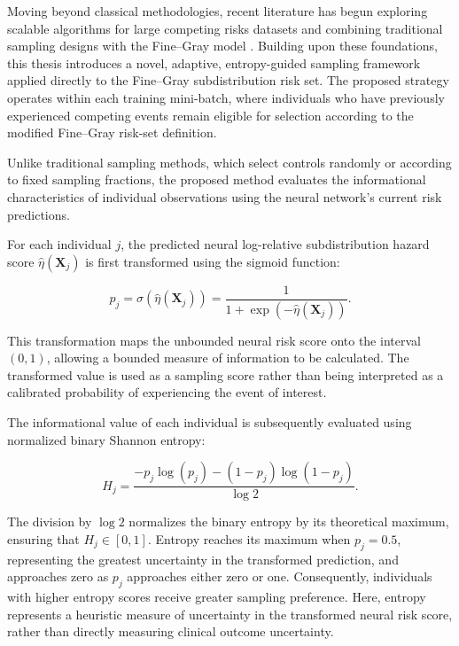 \documentclass[a4paper,twoside,12pt]{report}
\begin{document}
Moving beyond classical methodologies, recent literature has begun exploring scalable algorithms for large competing risks datasets \cite{kawaguchi2020scalable} and combining traditional sampling designs with the Fine--Gray model \cite{kim2020stratified}. Building upon these foundations, this thesis introduces a novel, adaptive, entropy-guided sampling framework applied directly to the Fine--Gray subdistribution risk set. The proposed strategy operates within each training mini-batch, where individuals who have previously experienced competing events remain eligible for selection according to the modified Fine--Gray risk-set definition.

Unlike traditional sampling methods, which select controls randomly or according to fixed sampling fractions, the proposed method evaluates the informational characteristics of individual observations using the neural network's current risk predictions.

For each individual $j$, the predicted neural log-relative subdistribution hazard score $\hat{\eta}(\boldsymbol{X}_j)$ is first transformed using the sigmoid function:

\begin{equation}
p_j =
\sigma\left(\hat{\eta}(\boldsymbol{X}_j)\right)
=
\frac{1}{1+\exp(-\hat{\eta}(\boldsymbol{X}_j))}.
\end{equation}

This transformation maps the unbounded neural risk score onto the interval $(0,1)$, allowing a bounded measure of information to be calculated. The transformed value is used as a sampling score rather than being interpreted as a calibrated probability of experiencing the event of interest.

The informational value of each individual is subsequently evaluated using normalized binary Shannon entropy:

\begin{equation}
H_j =
\frac{
-p_j\log(p_j)
-(1-p_j)\log(1-p_j)
}{\log 2}.
\end{equation}

The division by $\log 2$ normalizes the binary entropy by its theoretical maximum, ensuring that $H_j \in [0,1]$. Entropy reaches its maximum when $p_j=0.5$, representing the greatest uncertainty in the transformed prediction, and approaches zero as $p_j$ approaches either zero or one. Consequently, individuals with higher entropy scores receive greater sampling preference. Here, entropy represents a heuristic measure of uncertainty in the transformed neural risk score, rather than directly measuring clinical outcome uncertainty.
\end{document}

